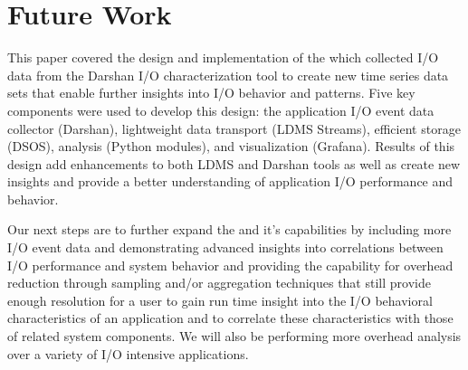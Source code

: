 \section{Future Work}
\label{sec:conclusion}
This paper covered the design and implementation of the \connector{} which 
collected I/O data from the Darshan I/O characterization tool to create new time series data sets
that enable further insights into I/O behavior and patterns. Five key components were used 
to develop this design: the application I/O event data collector (Darshan), lightweight data 
transport (LDMS Streams), efficient storage (DSOS), analysis (Python modules), and 
visualization (Grafana). Results of this design add enhancements to both LDMS and Darshan 
tools as well as create new insights and provide a better understanding of application 
I/O performance and behavior. 

Our next steps are to further expand the \connector{} and it's capabilities by
including more I/O event data and demonstrating advanced insights into correlations 
between I/O performance and system behavior and providing the
capability for overhead reduction through sampling and/or aggregation techniques that still
provide enough resolution for a user to gain run time insight into the I/O behavioral
characteristics of an application and to correlate these characteristics with those of
related system components. We will also be performing more overhead analysis over a variety
of I/O intensive applications.




